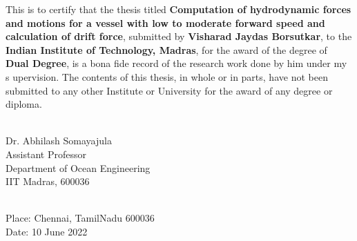 \certificate


This is to certify that the thesis titled {\bf  Computation of hydrodynamic forces and motions 
for a vessel with low to moderate forward speed and calculation of drift force}, 
submitted by {\bf Visharad Jaydas Borsutkar}, to the
 {\bf Indian Institute of Technology, Madras}, for the award of the degree of 
 {\bf Dual Degree}, is a bona fide record of the research work done by him under my s
 upervision. The contents of this thesis, in whole or in parts, have not been submitted 
 to any other Institute or University for the award of any degree or diploma.
\\[3cm]

\begin{singlespacing}
\hspace*{-0.25in}
\parbox{2.5in}{
\\[0.25cm]
\noindent Dr. Abhilash Somayajula \\ [0.15cm]
\noindent Assistant Professor \\[0.15cm]
\noindent Department of Ocean Engineering\\[0.15cm]
\noindent IIT Madras, 600036
} 
\end{singlespacing}
\\[2cm]


\noindent Place: Chennai, TamilNadu 600036\\
Date: 10 June 2022  